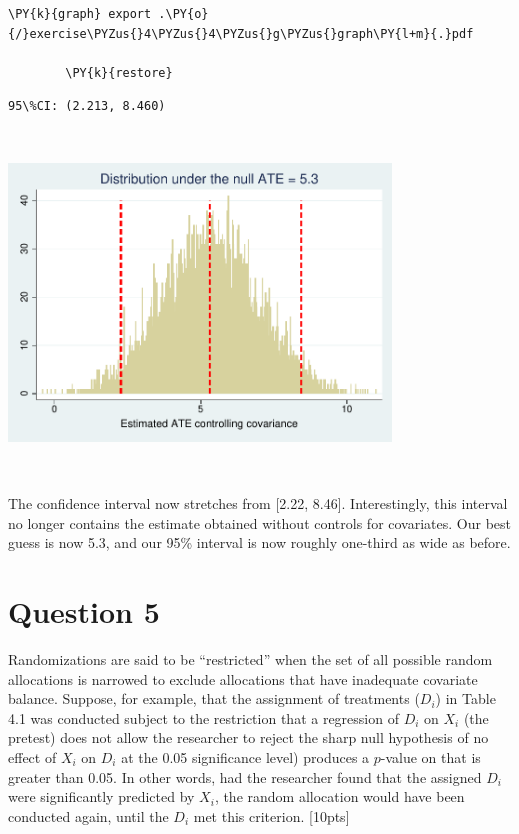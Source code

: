 \documentclass[11pt,notitlepage]{article}\usepackage[]{graphicx}\usepackage[]{color}
\makeatletter
\newenvironment{kframe}{%
 \def\at@end@of@kframe{}%
 \ifinner\ifhmode%
  \def\at@end@of@kframe{\end{minipage}}%
  \begin{minipage}{\columnwidth}%
 \fi\fi%
 \def\FrameCommand##1{\hskip\@totalleftmargin \hskip-\fboxsep
 \colorbox{shadecolor}{##1}\hskip-\fboxsep
     \hskip-\linewidth \hskip-\@totalleftmargin \hskip\columnwidth}%
 \MakeFramed {\advance\hsize-\width
   \@totalleftmargin\z@ \linewidth\hsize
   \@setminipage}}%
 {\par\unskip\endMakeFramed%
 \at@end@of@kframe}
\newenvironment{knitrout}{}{} %
\makeatother
\begin{document}
\begin{enumerate}[a)]
\begin{knitrout}
\begin{kframe}
\begin{Verbatim}[commandchars=\\\{\}]
        \PY{k}{graph} export .\PY{o}{/}exercise\PYZus{}4\PYZus{}4\PYZus{}g\PYZus{}graph\PY{l+m}{.}pdf
        
        \PY{k}{restore}
\end{Verbatim}

    \begin{Verbatim}[commandchars=\\\{\}]
95\%CI: (2.213, 8.460)
    \end{Verbatim}
\end{kframe}
{\centering \includegraphics[width=4in,height=3.6in]{figure/exercise_4_4_g_graph} 

}

\end{knitrout}

The confidence interval now stretches from [2.22, 8.46].  Interestingly, this interval no longer contains the estimate obtained without controls for covariates.  Our best guess is now 5.3, and our 95\% interval is now roughly one-third as wide as before.

\end{enumerate}

\section*{Question 5}


Randomizations are said to be ``restricted'' when the set of all possible random allocations is narrowed to exclude allocations that have inadequate covariate balance.  Suppose, for example, that the assignment of treatments ($D_i$) in Table 4.1 was conducted subject to the restriction that a regression of $D_i$ on $X_i$ (the pretest) does not allow the researcher to reject the sharp null hypothesis of no effect of $X_i$ on $D_i$ at the 0.05 significance level) produces a $p$-value on that is greater than 0.05. In other words, had the researcher found that the assigned $D_i$ were significantly predicted by $X_i$, the random allocation would have been conducted again, until the $D_i$ met this criterion. [10pts]
\end{document}
